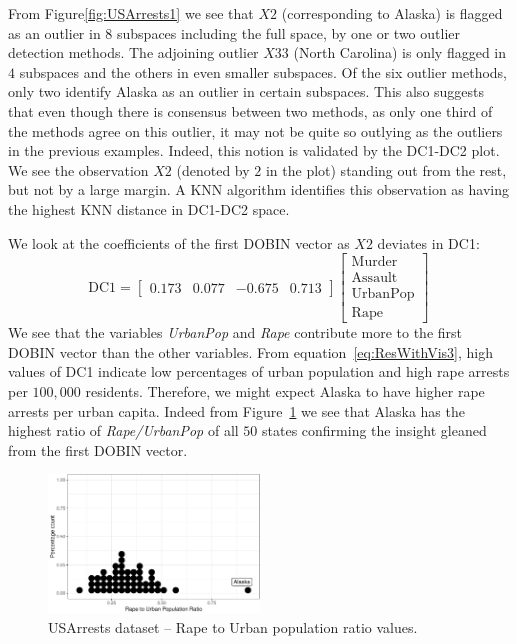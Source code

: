 \documentclass[letter,12pt]{article}
\begin{document}
From Figure\ref{fig:USArrests1} we see that $X2$ (corresponding to Alaska) is flagged as an outlier in $8$ subspaces including the full space, by one or two outlier detection methods. The adjoining outlier $X33$ (North Carolina) is only flagged in $4$ subspaces and the others in even smaller subspaces. Of the six outlier methods, only two identify Alaska as an outlier in certain subspaces. This also suggests that even though there is consensus between two methods, as only one third of the methods agree on this outlier, it may not be quite so outlying as the outliers in the previous examples. Indeed, this notion is validated by the DC1-DC2 plot. We see the observation $X2$ (denoted by $2$ in the plot) standing out from the rest, but not by a large margin. A KNN algorithm identifies this observation as having the highest KNN distance in DC1-DC2 space.

We look at the coefficients of the first DOBIN vector as $X2$ deviates in DC1:
\begin{equation}\label{eq:ResWithVis3}
	\text{DC1} = \begin{bmatrix}
		0.173 & 0.077 & -0.675 & 0.713
	\end{bmatrix}
	\begin{bmatrix}
		\text{Murder}   \\
		\text{Assault}  \\
		\text{UrbanPop} \\
		\text{Rape}
	\end{bmatrix} \,
\end{equation}
We see that the variables \textit{UrbanPop} and \textit{Rape} contribute more to the first DOBIN vector than the other variables. From equation~\eqref{eq:ResWithVis3}, high values of DC1 indicate low percentages of urban population and high rape arrests per $100,000$ residents. Therefore, we might expect Alaska to have higher rape arrests per urban capita. Indeed from Figure~\ref{fig:USArrests3} we see that Alaska has the highest ratio of \textit{Rape/UrbanPop} of all $50$ states confirming the insight gleaned from the first DOBIN vector.

\begin{figure}[!ht]
	\centering
	\includegraphics[width=0.5\textwidth]{Ex3_3.pdf}
	\caption{USArrests dataset -- Rape to Urban population ratio values.}
	\label{fig:USArrests3}
\end{figure}
\end{document}
